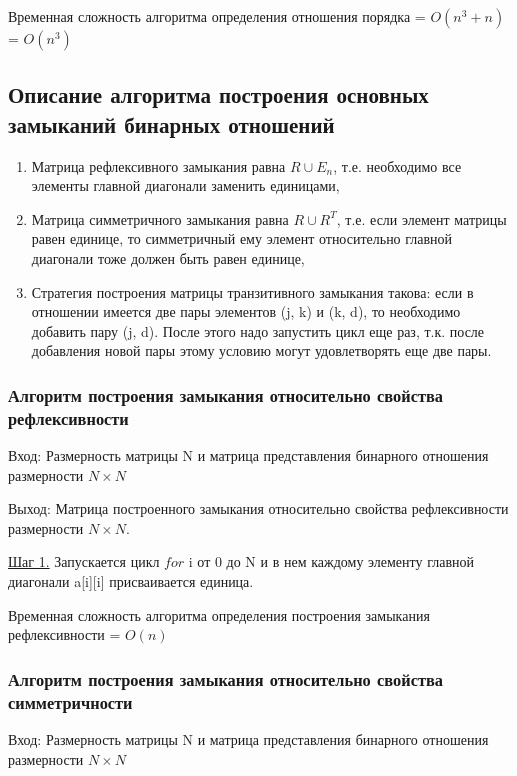 \documentclass[bachelor, och, labwork]{shiza}
\begin{document}
	Временная сложность алгоритма определения отношения порядка = $O(n^3 + n)$ = $O(n^3)$
	
	
	\subsection{Описание алгоритма построения основных замыканий бинарных отношений}
	
	\begin{enumerate}
		\item Матрица $\textit{рефлексивного}$ замыкания равна $R \cup E_n$, т.е. необходимо все элементы главной диагонали заменить единицами,
		\item Матрица $\textit{симметричного}$ замыкания равна $R \cup R^T$, т.е. если элемент матрицы равен единице, то симметричный ему элемент относительно главной диагонали тоже должен быть равен единице,
		\item Стратегия построения матрицы $\textit{транзитивного}$ замыкания такова: если в отношении имеется две пары элементов (j, k) и (k, d), то необходимо добавить пару (j, d). После этого надо запустить цикл еще раз, т.к. после добавления новой пары этому условию могут удовлетворять еще две пары. 
	\end{enumerate}

	\subsubsection{Алгоритм построения замыкания относительно свойства рефлексивности}
	
	$\textit{Вход:}$ Размерность матрицы N и матрица представления бинарного отношения размерности $N \times N$
	
	$\textit{Выход:}$  Матрица построенного замыкания относительно свойства рефлексивности размерности $N \times N$.
	
	\underline{Шаг 1.} Запускается цикл $for$ i от 0 до N и в нем каждому элементу главной диагонали a[i][i] присваивается единица.
	
	Временная сложность алгоритма определения построения замыкания рефлексивности = $O(n)$
	
	
	\subsubsection{Алгоритм построения замыкания относительно свойства симметричности}

	$\textit{Вход:}$ Размерность матрицы N и матрица представления бинарного отношения размерности $N \times N$
	
\end{document}
